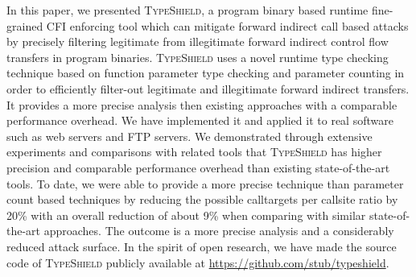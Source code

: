 In this paper, we presented \textsc{TypeShield}, a program binary based runtime fine-grained CFI enforcing
tool which can mitigate forward indirect call based attacks by precisely filtering legitimate from illegitimate 
forward indirect control flow transfers in program binaries.
\textsc{TypeShield} uses a novel runtime type checking technique based on function parameter
type checking and parameter counting in order to efficiently filter-out legitimate
and illegitimate forward indirect transfers.
It provides a more precise analysis then existing approaches with a
comparable performance overhead.
We have implemented it and applied it to real software such as web servers and FTP servers.
We demonstrated through extensive experiments and comparisons with related tools
that \textsc{TypeShield} has higher precision and comparable performance overhead than 
existing state-of-the-art tools. To date, we were able to provide a more precise
technique than parameter count based techniques by reducing the possible calltargets 
per callsite ratio by 20\% with an overall reduction of about 
9\% when comparing with similar state-of-the-art approaches.
The outcome is a more precise analysis and a considerably reduced attack surface.
In the spirit of open research,
we have made the source code of \textsc{TypeShield}
publicly available at \url{https://github.com/stub/typeshield}.


